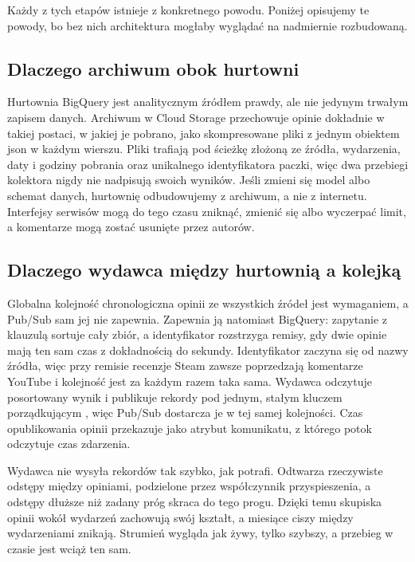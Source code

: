 Każdy z tych etapów istnieje z konkretnego powodu.
Poniżej opisujemy te powody, bo bez nich architektura mogłaby wyglądać na nadmiernie rozbudowaną.

\subsection{Dlaczego archiwum obok hurtowni}
\label{sec:design-archive}

Hurtownia BigQuery jest analitycznym źródłem prawdy, ale nie jedynym trwałym zapisem danych.
Archiwum w Cloud Storage przechowuje opinie dokładnie w takiej postaci, w jakiej je pobrano, jako skompresowane pliki z jednym obiektem \ac{json} w każdym wierszu.
Pliki trafiają pod ścieżkę złożoną ze źródła, wydarzenia, daty i godziny pobrania oraz unikalnego identyfikatora paczki, więc dwa przebiegi kolektora nigdy nie nadpisują swoich wyników.
Jeśli zmieni się model albo schemat danych, hurtownię odbudowujemy z archiwum, a nie z internetu.
Interfejsy serwisów mogą do tego czasu zniknąć, zmienić się albo wyczerpać limit, a komentarze mogą zostać usunięte przez autorów.

\subsection{Dlaczego wydawca między hurtownią a kolejką}
\label{sec:design-publisher}

Globalna kolejność chronologiczna opinii ze wszystkich źródeł jest wymaganiem, a Pub/Sub sam jej nie zapewnia.
Zapewnia ją natomiast BigQuery: zapytanie z klauzulą  sortuje cały zbiór, a identyfikator rozstrzyga remisy, gdy dwie opinie mają ten sam czas z dokładnością do sekundy.
Identyfikator zaczyna się od nazwy źródła, więc przy remisie recenzje Steam zawsze poprzedzają komentarze YouTube i kolejność jest za każdym razem taka sama.
Wydawca odczytuje posortowany wynik i publikuje rekordy pod jednym, stałym kluczem porządkującym , więc Pub/Sub dostarcza je w tej samej kolejności.
Czas opublikowania opinii przekazuje jako atrybut komunikatu, z którego potok odczytuje czas zdarzenia.

Wydawca nie wysyła rekordów tak szybko, jak potrafi.
Odtwarza rzeczywiste odstępy między opiniami, podzielone przez współczynnik przyspieszenia, a odstępy dłuższe niż zadany próg skraca do tego progu.
Dzięki temu skupiska opinii wokół wydarzeń zachowują swój kształt, a miesiące ciszy między wydarzeniami znikają.
Strumień wygląda jak żywy, tylko szybszy, a przebieg w czasie jest wciąż ten sam.

